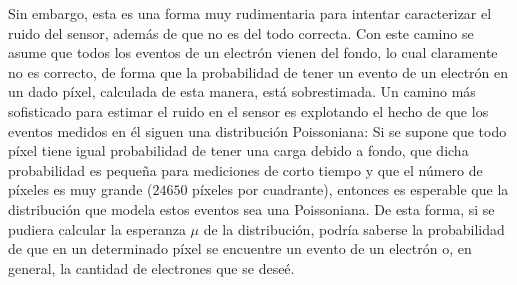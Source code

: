 \indent Sin embargo, esta es una forma muy rudimentaria para intentar caracterizar el ruido del sensor, además de que no es del todo correcta. Con este camino se asume que todos los eventos de un electrón vienen del fondo, lo cual claramente no es correcto, de forma que la probabilidad de tener un evento de un electrón en un dado píxel, calculada de esta manera, está sobrestimada. Un camino más sofisticado para estimar el ruido en el sensor es explotando el hecho de que los eventos medidos en él siguen una distribución Poissoniana: Si se supone que todo píxel tiene igual probabilidad de tener una carga debido a fondo, que dicha probabilidad es pequeña para mediciones de corto tiempo y que el número de píxeles es muy grande ($24650$ píxeles por cuadrante), entonces es esperable que la distribución que modela estos eventos sea una Poissoniana. De esta forma, si se pudiera calcular la esperanza $\mu$ de la distribución, podría saberse la probabilidad de que en un determinado píxel se encuentre un evento de un electrón o, en general, la cantidad de electrones que se deseé.\\

